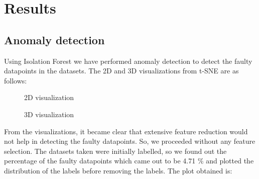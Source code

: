 \chapter{Results}\label{final}

\section{Anomaly detection}

Using Isolation Forest we have performed anomaly detection to detect the faulty datapoints in the datasets. The 2D and 3D visualizations from t-SNE are as follows:

\begin{figure}
%
  \caption{2D visualization}
  \label{fig:key}
\end{figure}

\begin{figure}
%
  \caption{3D visualization}
  \label{fig:key}
\end{figure}

From the visualizations, it became clear that extensive feature reduction would not help in detecting the faulty datapoints. So, we proceeded without any feature selection. 
The datasets taken were initially labelled, so we found out the percentage of the faulty datapoints which came out to be 4.71 \% and plotted the distribution of the labels before removing the labels. The plot obtained is: 

